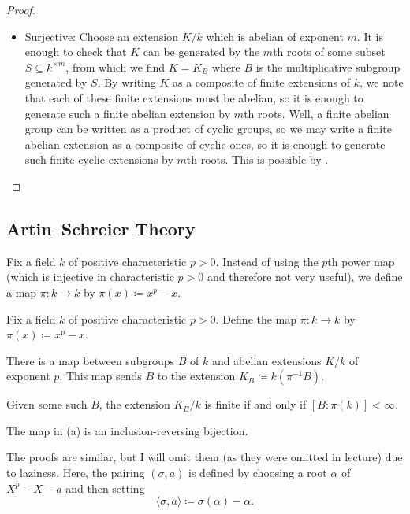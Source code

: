 \documentclass[../notes.tex]{subfiles}
\begin{document}
\begin{proof}
\begin{listalph}
\begin{itemize}
			\item Surjective: Choose an extension $K/k$ which is abelian of exponent $m$. It is enough to check that $K$ can be generated by the $m$th roots of some subset $S\subseteq k^{\times m}$, from which we find $K=K_B$ where $B$ is the multiplicative subgroup generated by $S$. By writing $K$ as a composite of finite extensions of $k$, we note that each of these finite extensions must be abelian, so it is enough to generate such a finite abelian extension by $m$th roots. Well, a finite abelian group can be written as a product of cyclic groups, so we may write a finite abelian extension as a composite of cyclic ones, so it is enough to generate such finite cyclic extensions by $m$th roots. This is possible by .
			\qedhere
		\end{itemize}
	\end{listalph}
\end{proof}

\subsection{Artin--Schreier Theory}
Fix a field $k$ of positive characteristic $p>0$. Instead of using the $p$th power map (which is injective in characteristic $p>0$ and therefore not very useful), we define a map $\pi\colon k\to k$ by $\pi(x)\coloneqq x^p-x$.
\begin{theorem}
	Fix a field $k$ of positive characteristic $p>0$. Define the map $\pi\colon k\to k$ by $\pi(x)\coloneqq x^p-x$.
	\begin{listalph}
		\item There is a map between subgroups $B$ of $k$ and abelian extensions $K/k$ of exponent $p$. This map sends $B$ to the extension $K_B\coloneqq k\left(\pi^{-1}B\right)$.
		\item Given some such $B$, the extension $K_B/k$ is finite if and only if $[B:\pi(k)]<\infty$.
		\item The map in (a) is an inclusion-reversing bijection.
	\end{listalph}
\end{theorem}
The proofs are similar, but I will omit them (as they were omitted in lecture) due to laziness. Here, the pairing $(\sigma,a)$ is defined by choosing a root $\alpha$ of $X^p-X-a$ and then setting
\[\langle\sigma,a\rangle\coloneqq\sigma(\alpha)-\alpha.\]
\end{document}
